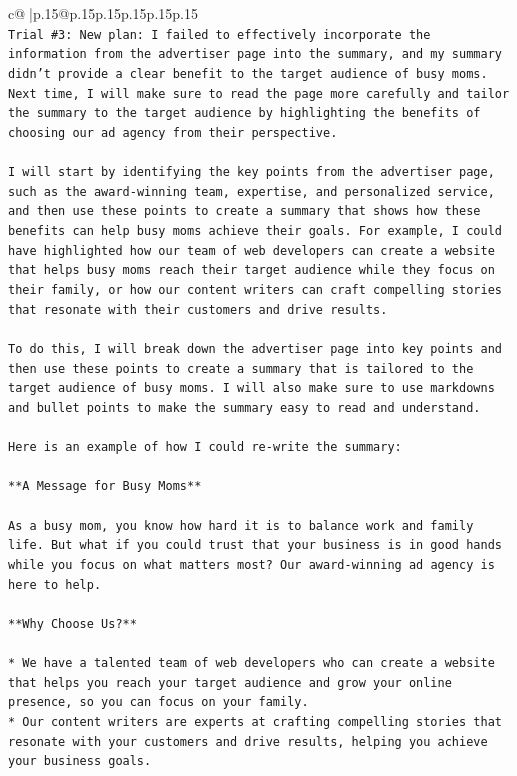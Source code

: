 \documentclass{article}
\begin{document}
{\begin{supertabular}{c@{$\;$}|p{.15\linewidth}@{}p{.15\linewidth}p{.15\linewidth}p{.15\linewidth}p{.15\linewidth}p{.15\linewidth}}
{{{\\ 
\texttt{Trial \#3: New plan: I failed to effectively incorporate the information from the advertiser page into the summary, and my summary didn't provide a clear benefit to the target audience of busy moms. Next time, I will make sure to read the page more carefully and tailor the summary to the target audience by highlighting the benefits of choosing our ad agency from their perspective. } \\
\\ 
\texttt{I will start by identifying the key points from the advertiser page, such as the award{-}winning team, expertise, and personalized service, and then use these points to create a summary that shows how these benefits can help busy moms achieve their goals. For example, I could have highlighted how our team of web developers can create a website that helps busy moms reach their target audience while they focus on their family, or how our content writers can craft compelling stories that resonate with their customers and drive results.} \\
\\ 
\texttt{To do this, I will break down the advertiser page into key points and then use these points to create a summary that is tailored to the target audience of busy moms. I will also make sure to use markdowns and bullet points to make the summary easy to read and understand.} \\
\\ 
\texttt{Here is an example of how I could re{-}write the summary:} \\
\\ 
\texttt{**A Message for Busy Moms**} \\
\\ 
\texttt{As a busy mom, you know how hard it is to balance work and family life. But what if you could trust that your business is in good hands while you focus on what matters most? Our award{-}winning ad agency is here to help.} \\
\\ 
\texttt{**Why Choose Us?**} \\
\\ 
\texttt{* We have a talented team of web developers who can create a website that helps you reach your target audience and grow your online presence, so you can focus on your family.} \\
\texttt{* Our content writers are experts at crafting compelling stories that resonate with your customers and drive results, helping you achieve your business goals.} \\
}}}
\end{supertabular}}
\end{document}
